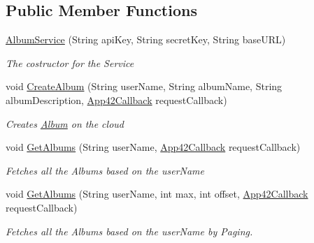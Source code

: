 \subsection*{Public Member Functions}
\begin{DoxyCompactItemize}
\item 
\hyperlink{classcom_1_1shephertz_1_1app42_1_1paas_1_1sdk_1_1windows_1_1gallery_1_1_album_service_aa2b8eb345e6d8e9606f646a5c7f274cb}{Album\+Service} (String api\+Key, String secret\+Key, String base\+U\+R\+L)
\begin{DoxyCompactList}\small\item\em The costructor for the Service \end{DoxyCompactList}\item 
void \hyperlink{classcom_1_1shephertz_1_1app42_1_1paas_1_1sdk_1_1windows_1_1gallery_1_1_album_service_adcf048f58ee47811bdf5efdd9e8215cc}{Create\+Album} (String user\+Name, String album\+Name, String album\+Description, \hyperlink{interfacecom_1_1shephertz_1_1app42_1_1paas_1_1sdk_1_1windows_1_1_app42_callback}{App42\+Callback} request\+Callback)
\begin{DoxyCompactList}\small\item\em Creates \hyperlink{classcom_1_1shephertz_1_1app42_1_1paas_1_1sdk_1_1windows_1_1gallery_1_1_album}{Album} on the cloud \end{DoxyCompactList}\item 
void \hyperlink{classcom_1_1shephertz_1_1app42_1_1paas_1_1sdk_1_1windows_1_1gallery_1_1_album_service_a73d91b31f536f8a8b361112190654508}{Get\+Albums} (String user\+Name, \hyperlink{interfacecom_1_1shephertz_1_1app42_1_1paas_1_1sdk_1_1windows_1_1_app42_callback}{App42\+Callback} request\+Callback)
\begin{DoxyCompactList}\small\item\em Fetches all the Albums based on the user\+Name \end{DoxyCompactList}\item 
void \hyperlink{classcom_1_1shephertz_1_1app42_1_1paas_1_1sdk_1_1windows_1_1gallery_1_1_album_service_a532562fa1b370a57a33263b00d6042b5}{Get\+Albums} (String user\+Name, int max, int offset, \hyperlink{interfacecom_1_1shephertz_1_1app42_1_1paas_1_1sdk_1_1windows_1_1_app42_callback}{App42\+Callback} request\+Callback)
\begin{DoxyCompactList}\small\item\em Fetches all the Albums based on the user\+Name by Paging. \end{DoxyCompactList}\item 

\end{DoxyCompactItemize}
